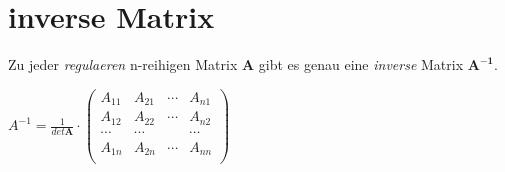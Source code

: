 \documentclass[11pt]{article}
\begin{document}
\section{inverse Matrix}
Zu jeder \textit{regulaeren} n-reihigen Matrix \textbf{A} gibt es genau eine \textit{inverse} Matrix $\mathbf{A^{-1}}$.

\begin{math}
A^{-1} = \frac{1}{det \mathbf{A}} \cdot 
\begin{pmatrix}
A_{11} & A_{21} & \cdots & A_{n1} \\
A_{12} & A_{22} & \cdots & A_{n2} \\
\cdots & \cdots & & \cdots \\
A_{1n} & A_{2n} & \cdots & A_{nn} \\

\end{pmatrix}
\end{math}
\end{document}
